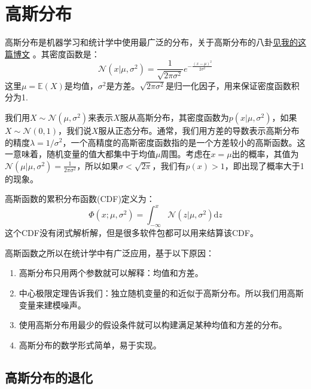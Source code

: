 \documentclass[10pt,a4paper,UTF8]{article}
\begin{document}
\section{高斯分布}
\label{sec:org5340d70}


高斯分布是机器学习和统计学中使用最广泛的分布，关于高斯分布的八卦\href{file:///c:/Users/cliyh/AppData/Roaming/zorg/output/math/probability/afcp-normal-distribution-history.org}{见我的这篇博文} 。其密度函数是：
\begin{equation}
\label{eq:10}
\mathcal{N}(x|\mu,\sigma^{2}) = \frac{1}{\sqrt{2\pi \sigma^{2}}}e^{-\frac{(x-\mu)^{2}}{2\sigma^{2}}}
\end{equation}
这里\(\mu = \mathbb{E}(X)\)是均值，\(\sigma^{2}\)是方差。\(\sqrt{2\pi\sigma^{2}}\)是归一化因子，用来保证密度函数积分为1.

我们用\(X\sim \mathcal{N}(\mu,\sigma^{2})\)来表示\(X\)服从高斯分布，其密度函数为\(p(x|\mu,\sigma^{2})\)，如果\(X\sim \mathcal{N}(0,1)\)，我们说\(X\)服从正态分布。通常，我们用方差的导数表示高斯分布的精度\(\lambda = 1/\sigma^{2}\)，一个高精度的高斯密度函数指的是一个方差较小的高斯函数。这一意味着，随机变量的值大都集中于均值\(\mu\)周围。考虑在\(x=\mu\)出的概率，其值为\(\mathcal{N}(\mu|\mu,\sigma^{2}) = \frac{1}{2\pi \sigma^{2}}\)，所以如果\(\sigma < \sqrt{2\pi}\)，我们有\(p(x) > 1\)，即出现了概率大于1的现象。

高斯函数的累积分布函数(CDF)定义为：
\begin{equation}
\label{eq:11}
\Phi(x;\mu,\sigma^{2})= \int_{-\infty}^{x} \mathcal{N}(z|\mu,\sigma^{2}) \mathrm{d}z
\end{equation}
这个CDF没有闭式解析解，但是很多软件包都可以用来结算该CDF。

高斯函数之所以在统计学中有广泛应用，基于以下原因：
\begin{enumerate}
\item 高斯分布只用两个参数就可以解释：均值和方差。
\item 中心极限定理告诉我们：独立随机变量的和近似于高斯分布。所以我们用高斯变量来建模噪声。
\item 使用高斯分布用最少的假设条件就可以构建满足某种均值和方差的分布。
\item 高斯分布的数学形式简单，易于实现。
\end{enumerate}

\subsection{高斯分布的退化}
\label{sec:org84c3e54}
\end{document}
